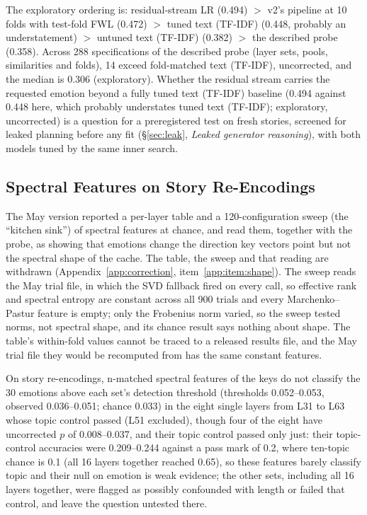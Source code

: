 \documentclass[11pt,a4paper]{article}
\begin{document}
The exploratory ordering is: residual-stream LR (0.494) $>$ v2's pipeline at 10 folds with test-fold FWL (0.472) $>$ tuned text (TF-IDF) (0.448, probably an understatement) $>$ untuned text (TF-IDF) (0.382) $>$ the described probe (0.358). Across 288 specifications of the described probe (layer sets, pools, similarities and folds), 14 exceed fold-matched text (TF-IDF), uncorrected, and the median is 0.306 (exploratory). Whether the residual stream carries the requested emotion beyond a fully tuned text (TF-IDF) baseline (0.494 against 0.448 here, which probably understates tuned text (TF-IDF); exploratory, uncorrected) is a question for a preregistered test on fresh stories, screened for leaked planning before any fit (\S\ref{sec:leak}, \emph{Leaked generator reasoning}), with both models tuned by the same inner search.

\subsection{Spectral Features on Story Re-Encodings}
\label{sec:spectral_null}

The May version reported a per-layer table and a 120-configuration sweep (the ``kitchen sink'') of spectral features at chance, and read them, together with the probe, as showing that emotions change the direction key vectors point but not the spectral shape of the cache. The table, the sweep and that reading are withdrawn (Appendix~\ref{app:correction}, item~\ref{app:item:shape}). The sweep reads the May trial file, in which the SVD fallback fired on every call, so effective rank and spectral entropy are constant across all 900 trials and every Marchenko--Pastur feature is empty; only the Frobenius norm varied, so the sweep tested norms, not spectral shape, and its chance result says nothing about shape. The table's within-fold values cannot be traced to a released results file, and the May trial file they would be recomputed from has the same constant features.

On story re-encodings, n-matched spectral features of the keys do not classify the 30 emotions above each set's detection threshold (thresholds 0.052--0.053, observed 0.036--0.051; chance 0.033) in the eight single layers from L31 to L63 whose topic control passed (L51 excluded), though four of the eight have uncorrected $p$ of 0.008--0.037, and their topic control passed only just: their topic-control accuracies were 0.209--0.244 against a pass mark of 0.2, where ten-topic chance is 0.1 (all 16 layers together reached 0.65), so these features barely classify topic and their null on emotion is weak evidence; the other sets, including all 16 layers together, were flagged as possibly confounded with length or failed that control, and leave the question untested there.
\end{document}
